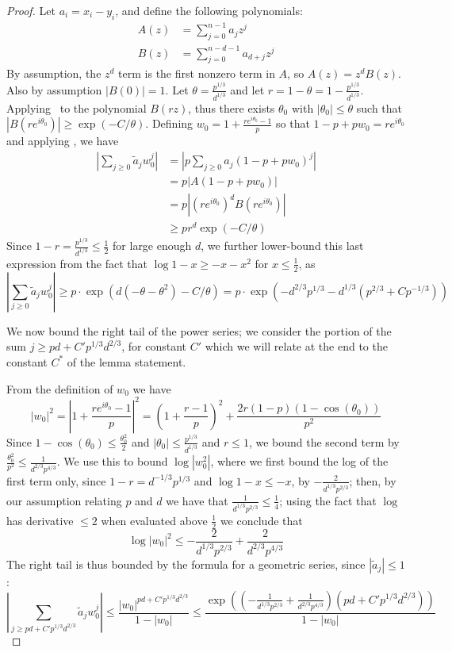 \documentclass[11pt]{article}
\theoremstyle{plain}
\newcommand{\abs}[1]{\left|#1\right|}
\begin{document}
\begin{proof}
    Let $a_i = x_i - y_i$, and define the following polynomials:
    \begin{align*}
        A(z) &= \sum_{j=0}^{n-1} a_j z^j \\
        B(z) &= \sum_{j=0}^{n-d-1} a_{d+j} z^j
    \end{align*}
    By assumption, the $z^d$ term is the first nonzero term in $A$, so $A(z) = z^{d} B(z)$. Also by assumption $|B(0)| = 1$. Let $\theta = \frac{p^{1/3}}{d^{1/3}}$ and let $r=1-\theta=1-\frac{p^{1/3}}{d^{1/3}}$. Applying~ to the polynomial $B(r z)$, thus there exists $\theta_0$ with $|\theta_0| \leq \theta$ such that $|B(re^{i\theta_0})| \geq \exp(-C/\theta)$. Defining $w_0 = 1 + \frac{r e^{i\theta_0}-1}{p}$ so that $1-p+pw_0=r e^{i\theta_0}$ and applying , we have
    \begin{align*}
        \abs{\sum_{j \geq 0} \tilde{a}_j w_0^j} &= \abs{p \sum_{j \geq 0} a_j (1-p+pw_0)^j} \\
        &= p\abs{A(1-p+pw_0)} \\
        &= p\abs{(r e^{i\theta_0})^d B(r e^{i\theta_0})} \\
        &\geq p r^d \exp(-C/\theta)
    \end{align*}
    Since $1-r=\frac{p^{1/3}}{d^{1/3}} \leq \frac{1}{2}$ for large enough $d$, we further lower-bound this last expression from the fact that $\log 1-x\geq -x-x^2$ for $x\leq \frac{1}{2}$, as
    \begin{equation}\label{eq:mean-bound} \abs{\sum_{j \geq 0} \tilde{a}_j w_0^j}\geq p \cdot\exp(d(-\theta-\theta^2)-C/\theta)=p\cdot \exp(-d^{2/3}p^{1/3}-d^{1/3}(p^{2/3}+C p^{-1/3}))\end{equation}
    
    We now bound the right tail of the power series; we consider the portion of the sum $j \geq pd+C'p^{1/3}d^{2/3}$, for constant $C'$ which we will relate at the end to the constant $C^*$ of the lemma statement.
    
    From the definition of $w_0$  we have
    \[        |w_0|^2 = \abs{1 + \frac{r e^{i\theta_0}-1}{p}}^2 =(1+\frac{r-1}{p})^2+\frac{2r(1-p)(1-\cos (\theta_0))}{p^2}\]
    Since $1-\cos(\theta_0)\leq \frac{\theta_0^2}{2}$ and $|\theta_0|\leq \frac{p^{1/3}}{d^{1/3}}$ and $r\leq 1$, we bound the second term by $\frac{\theta_0^2}{p^2}\leq \frac{1}{d^{2/3}p^{4/3}}$. We use this to bound $\log|w_0^2|$, where we first bound the log of the first term only, since $1-r=d^{-1/3}p^{1/3}$ and $\log 1-x\leq -x$, by $-\frac{2}{d^{1/3}p^{2/3}}$; then, by our assumption relating $p$ and $d$ we have that $\frac{1}{d^{1/3}p^{2/3}}\leq\frac{1}{4}$; using the fact that $\log$ has derivative $\leq 2$ when evaluated above $\frac{1}{2}$ we conclude that \[\log|w_0|^2\leq -\frac{2}{d^{1/3}p^{2/3}}+\frac{2}{d^{2/3}p^{4/3}}\]
    The right tail is thus bounded by the formula for a geometric series, since $|\tilde{a}_j|\leq 1$:
    \[\abs{\sum_{j \geq pd+C'p^{1/3}d^{2/3}} \tilde{a}_j w_0^j} \leq \frac{|w_0|^{pd+C'p^{1/3}d^{2/3}}}{1-|w_0|} \leq \frac{\exp((-\frac{1}{d^{1/3}p^{2/3}}+\frac{1}{d^{2/3}p^{4/3}})(pd+C'p^{1/3}d^{2/3}))}{1-|w_0|}\]


\end{proof}
\end{document}
